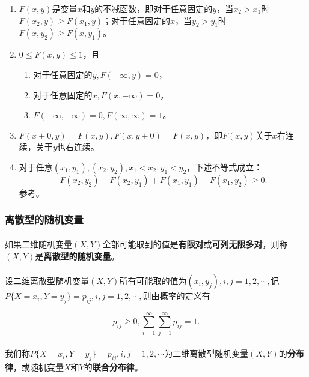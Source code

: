 \begin{enumerate}
  \item $F(x,y)$是变量$x$和$y$的不减函数，即对于任意固定的$y$，当$x_2 > x_1$时$F(x_2,y)\geq F(x_1,y)$；对于任意固定的$x$，当$y_2 > y_1$时$F(x,y_2) \geq F(x,y_1)$。
  \item $0 \leq F(x,y) \leq 1$，且
  \begin{enumerate}
    \item 对于任意固定的$y, F(-\infty,y)=0$，
    \item 对于任意固定的$x, F(x,-\infty)=0$，
    \item $F(-\infty, -\infty) = 0, F(\infty,\infty)=1$。
  \end{enumerate}
  \item $F(x+0,y)=F(x,y),F(x,y+0)=F(x,y)$，即$F(x,y)$关于$x$右连续，关于$y$也右连续。
  \item 对于任意$(x_1,y_1), (x_2,y_2), x_1 < x_2, y_1 < y_2$，下述不等式成立：
  \begin{equation}
    F(x_2,y_2) - F(x_2,y_1) + F(x_1,y_1) - F(x_1,y_2) \geq 0.
  \end{equation}
  参考。
\end{enumerate}

\subsubsection{离散型的随机变量}
\paragraph{}
如果二维随机变量$(X,Y)$全部可能取到的值是\textbf{有限对}或\textbf{可列无限多对}，则称$(X,Y)$是\textbf{离散型的随机变量}。
\paragraph{}
设二维离散型随机变量$(X,Y)$所有可能取的值为$(x_i,y_j),i,j=1,2,\cdots,$记$P\{X=x_i,Y=y_j\}=p_{ij},i,j=1,2,\cdots,$则由概率的定义有

\begin{equation}
  p_{ij} \geq 0, \sum_{i=1}^\infty\sum_{j=1}^\infty p_{ij} = 1.
\end{equation}

\paragraph{}
我们称$P\{X=x_i,Y=y_j\}=p_{ij},i,j=1,2,\cdots$为二维离散型随机变量$(X,Y)$的\textbf{分布律}，或随机变量$X$和$Y$的\textbf{联合分布律}。

